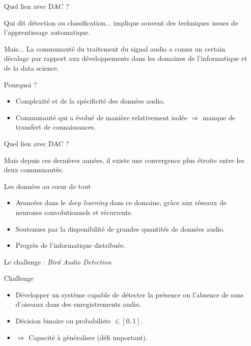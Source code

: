 \documentclass[compress,xcolor=table]{beamer}
\begin{document}
\begin{frame}{Quel lien avec DAC ?}

    Qui dit détection ou classification... implique souvent des techniques issues de l'apprentissage automatique.

    \begin{alertblock}{Mais...}
        La communauté du traitement du signal audio a connu un certain décalage par rapport aux développements dans les domaines de l'informatique et de la data science.
    \end{alertblock}

    \begin{block}{Pourquoi ?}
        \begin{itemize}
            \item Complexité et de la spécificité des données audio.
            \item Communauté qui a évolué de manière relativement isolée $\Rightarrow$ manque de transfert de connaissances.
        \end{itemize}

    \end{block}

\end{frame}

\begin{frame}{Quel lien avec DAC ?}

    Mais depuis ces dernières années, il existe une convergence plus étroite entre les deux communautés.

    \begin{exampleblock}{Les données au c\oe ur de tout}
        \begin{itemize}
            \item Avancées dans le \textit{deep learning} dans ce domaine, grâce aux réseaux de neurones convolutionnels et récurrents.
            \item Soutenues par la disponibilité de grandes quantités de données audio.
            \item Progrès de l'informatique distribuée.
        \end{itemize}
    \end{exampleblock}

\end{frame}

\begin{frame}{Le challenge : \textit{Bird Audio Detection}}

    \begin{block}{Challenge}
        \begin{itemize}
            \item Développer un système capable de détecter la présence ou l'absence de sons d'oiseaux dans des enregistrements audio.
            \item Décision binaire ou probabiliste $\in [0,1]$.
            \item $\Rightarrow$ Capacité à généraliser (défi important).
        \end{itemize}
    \end{block}

\end{frame}
\end{document}
